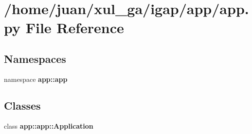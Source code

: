 \section{/home/juan/xul\_\-ga/igap/app/app.py File Reference}
\label{app_8py}
\subsection*{Namespaces}
\begin{CompactItemize}
\item 
namespace {\bf app::app}
\end{CompactItemize}
\subsection*{Classes}
\begin{CompactItemize}
\item 
class {\bf app::app::Application}
\end{CompactItemize}
